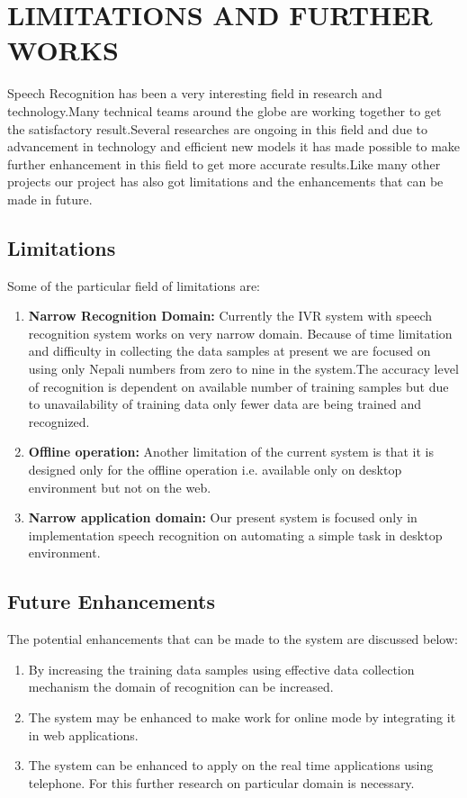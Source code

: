 

\section{LIMITATIONS AND FURTHER WORKS}
Speech Recognition has been a very interesting field in research and technology.Many technical teams around the globe are working together to get the satisfactory result.Several researches are ongoing in this field and due to advancement in technology and efficient new models it has made possible to make further enhancement in this field to get more accurate results.Like many other projects our project has also got limitations and the enhancements that can be made in future.

\subsection{Limitations}
Some of the particular field of limitations  are:
\begin{enumerate}
	\item \textbf{Narrow Recognition Domain: }
	Currently the IVR system with speech recognition system works on very narrow domain. Because of time limitation and difficulty in collecting the data samples at present we are focused on using only Nepali numbers from zero to nine in the system.The accuracy level of recognition is dependent on available number of training samples but due to unavailability of training data only fewer data are being trained and recognized.
	\item \textbf{Offline operation: }
	Another limitation of the current system is that it is 
	designed only for the offline operation i.e. available only on desktop environment but not on the web.
	\item \textbf{Narrow application domain: }
	Our present system is focused only in implementation speech recognition on automating a simple task in desktop environment.
	
	
\end{enumerate}

\subsection{Future Enhancements}
The potential enhancements that can be made to the system are discussed below:
\begin{enumerate}
	\item By increasing the training data samples using effective data collection mechanism the domain of recognition can be increased.
	\item The system may be enhanced to make work for online mode by integrating it in web applications.
	\item The system can be enhanced to apply on the real time applications using telephone. For this further research on particular domain is necessary.
\end{enumerate}




